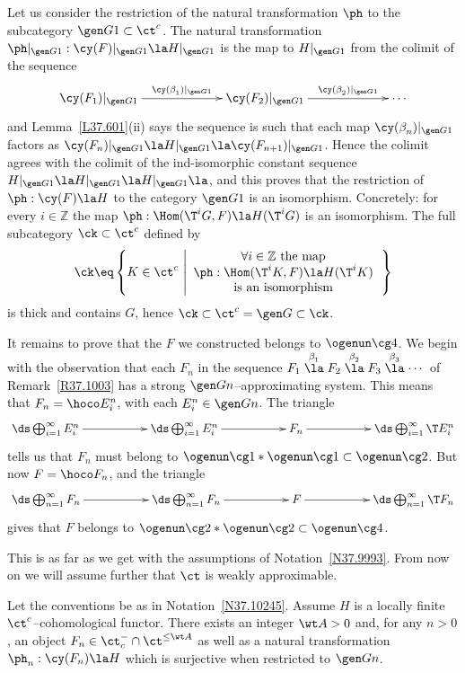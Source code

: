 \documentclass[11pt]{amsart}
\newcommand{\zz}{{\mathbb Z}}
\begin{document}
Let us consider the restriction of the natural transformation
$\ph$ to the subcategory $\gen G1\subset\ct^c$.
The natural transformation $\ph|_{\gen G1}:\cy(F)|_{\gen G1}\la H|_{\gen G1}$
is the map to $H|_{\gen G1}$ from the colimit of the sequence
\[\xymatrix@C+40pt{
  \cy(F_1)|_{\gen G1}\ar[r]^-{\cy(\beta_1^{})|_{\gen G1}}
  &\cy(F_2)|_{\gen G1}\ar[r]^-{\cy(\beta_2^{})|_{\gen G1}}
 &\cdots
}\]
and Lemma~\ref{L37.601}(ii) says the sequence is
such that each map 
$\cy(\beta_n^{})|_{\gen G1}$ factors
as $\cy(F_n)|_{\gen G1}\la H|_{\gen G1}\la \cy(F_{n+1})|_{\gen G1}$.
Hence the colimit agrees with the colimit
of the ind-isomorphic
constant sequence $H|_{\gen G1}\la H|_{\gen G1}\la H|_{\gen G1}\la $,
and this proves that the restriction of $\ph:\cy(F)\la H$
to the category $\gen G1$ is an isomorphism. Concretely: for every
$i\in\zz$ the map $\ph:\Hom(\T^iG,F)\la H(\T^iG)$
is an isomorphism.
The full subcategory $\ck\subset\ct^c$ defined by
\[
\ck\eq\left\{
K\in\ct^c\,\left|\begin{array}{c}
\forall i\in\zz\text{\rm\ the map}\\
\ph:\Hom(\T^iK,F)\la H(\T^iK)\\
\text{\rm is an isomorphism}
\end{array}
\right.\right\}
\]
is thick and contains $G$, hence $\ck\subset\ct^c=\gen G{}\subset\ck$.

It remains to prove that the $F$ we constructed belongs to $\ogenun \cg4$.
We begin with the observation that each $F_n$ in the sequence
$F_1\stackrel{\beta_1^{}}\la F_2
\stackrel{\beta_2^{}}\la F_3\stackrel{\beta_3^{}}\la\cdots$
of Remark~\ref{R37.1003}  has a strong $\gen Gn$--approximating system.
This means that $F_n=\hoco E_i^n$, with each $E_i^n\in\gen Gn$.
The triangle
\[\xymatrix@C+30pt{
  \ds\bigoplus_{i=1}^\infty E_i^n \ar[r] &
  \ds\bigoplus_{i=1}^\infty E_i^n \ar[r] &
  F_n\ar[r] &
  \ds\bigoplus_{i=1}^\infty\T E_i^n  
}\]
tells us that $F_n$ must belong to
$\ogenun\cg1*\ogenun\cg1\subset\ogenun \cg 2$.
But now $F=\hoco F_n$, and the triangle
\[\xymatrix@C+30pt{
  \ds\bigoplus_{n=1}^\infty F_n \ar[r] &
  \ds\bigoplus_{n=1}^\infty F_n \ar[r] &
  F\ar[r] &
  \ds\bigoplus_{n=1}^\infty\T F_n  
}\]
gives that $F$ belongs to $\ogenun\cg2*\ogenun\cg2\subset\ogenun\cg4$.
\eprf

This is as far as we get with the
assumptions of Notation~\ref{N37.9993}.
From now on we will assume further
that $\ct$ is weakly approximable.
\entn

Let the conventions be as in Notation~\ref{N37.10245}. 
Assume
$H$ is a locally finite $\ct^c$--cohomological functor.
There exists an integer $\wt A>0$ and, for any
$n>0$, an object $F_n\in\ct^-_c\cap\ct^{\leq\wt A}$
as well as a natural transformation
$\ph_n:\cy(F_n)\la H$
which is surjective when restricted to $\gen Gn$.
\elem
\end{document}
